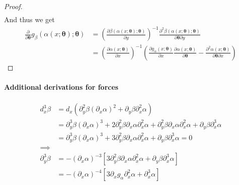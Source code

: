 \begin{proof}
\begin{align}
    \end{align}
    And thus we get
    \begin{align}
        \frac{\partial}{\partial \bm \theta} g_{\beta}(\alpha(x; \bm \theta); \bm \theta) 
        &= \left( \frac{\partial \beta(\alpha(x; \bm \theta); \bm \theta)}{\partial y}  \right)^{-1} \frac{\partial^{2}\beta(\alpha(x; \bm \theta); \bm \theta)}{\partial \bm \theta \partial y} \\
        &= \left(\frac{\partial \alpha(x; \bm \theta)}{\partial x} \right)^{-1} \left(\frac{\partial g_{\alpha}(x; \bm \theta)}{\partial x} \frac{\partial \alpha(x; \bm \theta)}{\partial \bm \theta}  - \frac{\partial^{2} \alpha(x; \bm \theta)}{\partial \bm \theta \partial x} \right)
    \end{align}
\end{proof}

\paragraph{Additional derivations for forces}

\begin{align}
    d^3_{x} \beta 
    &= d_{x} \left( 
        \partial_{y}^{2} \beta \left(\partial_{x} \alpha \right)^2 
        + \partial_{y} \beta \partial_{x}^{2} \alpha 
    \right) \\
    &= \partial_{y}^{3} \beta \left(\partial_{x} \alpha \right)^3 
    + 2  \partial_{y}^{2} \beta \partial_{x} \alpha \partial^2_{x} \alpha
    + \partial^2_{y} \beta \partial_{x} \alpha \partial_{x}^{2} \alpha
    + \partial_{y} \beta \partial_{x}^{3} \alpha\\
    &= \partial_{y}^{3} \beta \left(\partial_{x} \alpha \right)^3 
    + 3  \partial_{y}^{2} \beta \partial_{x} \alpha \partial^2_{x} \alpha
    + \partial_{y} \beta \partial_{x}^{3} \alpha = 0\\
    \implies&\\
    \partial_{y}^{3} \beta &= -\left(\partial_{x} \alpha \right)^{-3}\left[ 3  \partial_{y}^{2} \beta \partial_{x} \alpha \partial^2_{x} \alpha
    + \partial_{y} \beta \partial_{x}^{3} \alpha \right] \\
     &= -\left(\partial_{x} \alpha \right)^{-4}\left[ 3   \partial_{x} g_{\alpha}   \partial^2_{x} \alpha
    + \partial_{x}^{3} \alpha \right] \\
\end{align}

